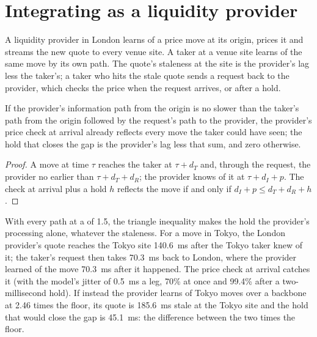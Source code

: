 \section{Integrating as a liquidity provider}

A liquidity provider in London learns of a price move at its origin, prices it and streams the new quote to every venue site. A taker
at a venue site learns of the same move by its own path. The quote's staleness at the site is the provider's lag less the
taker's; a taker who hits the stale quote sends a request back to the provider, which checks the price when the request arrives,
or after a hold.

\label{lst:nw:fx-connectivity:stale}

\begin{proposition}\label{prop:nw:fx-connectivity:hold}
If the provider's information path from the origin is no slower than the taker's path from the origin followed by the request's
path to the provider, the provider's price check at arrival already reflects every move the taker could have seen; the hold that
closes the gap is the provider's lag less that sum, and zero otherwise.
\end{proposition}

\begin{proof}
A move at time $\tau$ reaches the taker at $\tau + d_T$ and, through the request, the provider no earlier than $\tau + d_T + d_R$;
the provider knows of it at $\tau + d_I + p$. The check at arrival plus a hold $h$ reflects the move if and only if
$d_I + p \le d_T + d_R + h$.
\end{proof}

With every path at a  of 1.5, the triangle inequality makes the hold the provider's processing alone, whatever the
staleness. For a move in Tokyo, the London provider's quote reaches the Tokyo site \qty{140.6}{\milli\second} after the Tokyo taker
knew of it; the taker's request then takes \qty{70.3}{\milli\second} back to London, where the provider learned of the move
\qty{70.3}{\milli\second} after it happened. The price check at arrival catches it (with the model's jitter of
\qty{0.5}{\milli\second} a leg, 70\% at once and 99.4\% after a two-millisecond hold). If instead the provider learns of Tokyo moves
over a backbone at 2.46 times the floor, its quote is \qty{185.6}{\milli\second} stale at the Tokyo site and the hold that would
close the gap is \qty{45.1}{\milli\second}: the difference between the two  times the floor.

